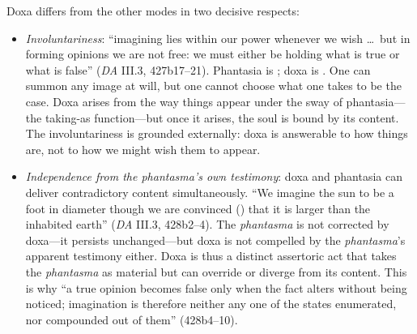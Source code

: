 \begin{itemize}
\begin{itemize}
\begin{itemize}
\begin{enumerate}
                  Doxa differs from the other modes in two decisive respects:

                  \begin{itemize}
                      \item \textit{Involuntariness}: ``imagining lies within our
                      power whenever we wish \ldots\ but in forming opinions we are
                      not free: we must either be holding what is true or what is
                      false'' (\textit{DA} III.3, 427b17--21). Phantasia is
                      ; doxa is . One can summon
                      any image at will, but one cannot choose what one takes to be
                      the case. Doxa arises from the way things appear under the
                      sway of phantasia---the taking-as function---but once it
                      arises, the soul is bound by its content. The involuntariness
                      is grounded externally: doxa is answerable to how things are,
                      not to how we might wish them to appear.
                      \item \textit{Independence from the phantasma's own testimony}:
                      doxa and phantasia can deliver contradictory content
                      simultaneously. ``We imagine the sun to be a foot in diameter
                      though we are convinced () that it is larger
                      than the inhabited earth'' (\textit{DA} III.3, 428b2--4). The
                      \textit{phantasma} is not corrected by doxa---it persists
                      unchanged---but doxa is not compelled by the
                      \textit{phantasma}'s apparent testimony either. Doxa is thus a
                      distinct assertoric act that takes the \textit{phantasma} as
                      material but can override or diverge from its content. This is
                      why ``a true opinion becomes false only when the fact alters
                      without being noticed; imagination is therefore neither any one
                      of the states enumerated, nor compounded out of them''
                      (428b4--10).
                  \end{itemize}


\end{enumerate}
\end{itemize}
\end{itemize}
\end{itemize}
